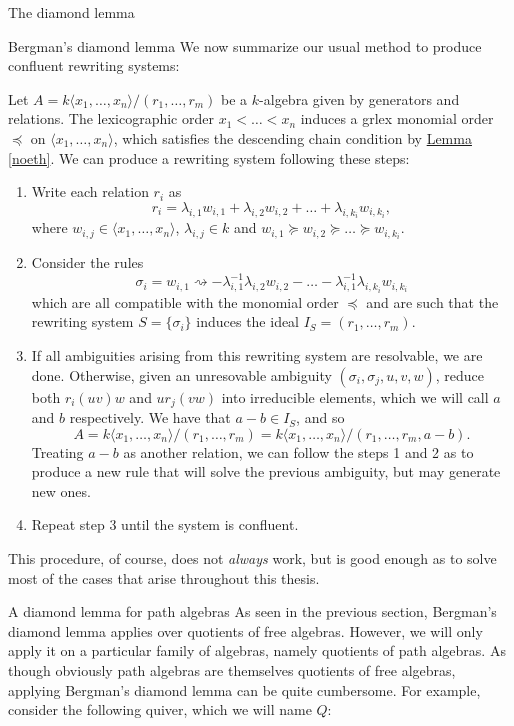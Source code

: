 \begin{chapter}{The diamond lemma}
\begin{section}{Bergman's diamond lemma}
We now summarize our usual method to produce confluent rewriting systems:

\begin{heur}\label{heuristic} Let $A=k\langle x_1,\dots,x_n\rangle/(r_1,\dots,r_m)$ be a $k$-algebra given by generators and relations. The lexicographic order $x_1<\dots<x_n$ induces a grlex monomial order $\preceq$ on $\langle x_1,\dots,x_n\rangle$, which satisfies the descending chain condition by \hyperref[noeth]{Lemma \ref*{noeth}}. We can produce a rewriting system following these steps:
\begin{enumerate}
\item Write each relation $r_i$ as
\[r_i = \lambda_{i,1}w_{i,1} + \lambda_{i,2} w_{i,2} + \dots + \lambda_{i,k_i} w_{i, k_i},\]
where $w_{i,j}\in \langle x_1,\dots,x_n\rangle$, $\lambda_{i,j}\in k$ and $w_{i,1}\succeq w_{i,2}\succeq\dots\succeq w_{i,k_i}$.
\item Consider the rules
\[\sigma_i = w_{i,1} \rightsquigarrow -\lambda_{i,1}^{-1}\lambda_{i,2}w_{i,2}-\dots-\lambda_{i,1}^{-1}\lambda_{i,k_i}w_{i,k_i}\]
which are all compatible with the monomial order $\preceq$ and are such that the rewriting system $S=\{\sigma_i\}$ induces the ideal $I_S=(r_1,\dots,r_m)$.
\item If all ambiguities arising from this rewriting system are resolvable, we are done. Otherwise, given an unresovable ambiguity $(\sigma_i, \sigma_j, u,v,w)$, reduce both $r_i(uv)w$ and $ur_j(vw)$ into irreducible elements, which we will call $a$ and $b$ respectively. We have that $a-b\in I_S$, and so \[A=k\langle x_1,\dots,x_n\rangle/(r_1,\dots,r_m)=k\langle x_1,\dots,x_n\rangle/(r_1,\dots,r_m, a-b).\]
Treating $a-b$ as another relation, we can follow the steps 1 and 2 as to produce a new rule that will solve the previous ambiguity, but may generate new ones.
\item Repeat step 3 until the system is confluent.
\end{enumerate}
This procedure, of course, does not \emph{always} work, but is good enough as to solve most of the cases that arise throughout this thesis.
\end{heur}
\end{section}
\begin{section}{A diamond lemma for path algebras}
\label{path-diamond}
As seen in the previous section, Bergman's diamond lemma applies over quotients of free algebras. However, we will only apply it on a particular family of algebras, namely quotients of path algebras. As though obviously path algebras are themselves quotients of free algebras, applying Bergman's diamond lemma can be quite cumbersome. For example, consider the following quiver, which we will name $Q$:

\end{section}
\end{chapter}
